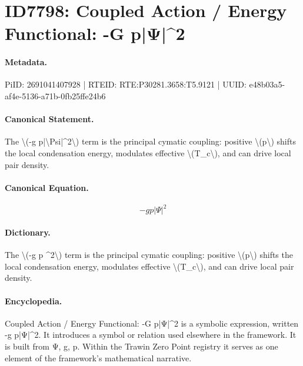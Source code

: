 \section*{ID7798: Coupled Action / Energy Functional: -G p|Ψ|\textasciicircum{}2}
\paragraph{Metadata.}
PiID: 2691041407928 | RTEID: RTE:P30281.3658:T5.9121 | UUID: e48b03a5-af4e-5136-a71b-0fb25ffe24b6

\paragraph{Canonical Statement.}
The \textbackslash{}(-g p|\textbackslash{}Psi|\textasciicircum{}2\textbackslash{}) term is the principal cymatic coupling: positive \textbackslash{}(p\textbackslash{}) shifts the local condensation energy, modulates effective \textbackslash{}(T\_c\textbackslash{}), and can drive local pair density.

\paragraph{Canonical Equation.}
\[
-g p|\Psi|^2
\]

\paragraph{Dictionary.}
The \textbackslash{}(-g p \textasciicircum{}2\textbackslash{}) term is the principal cymatic coupling: positive \textbackslash{}(p\textbackslash{}) shifts the local condensation energy, modulates effective \textbackslash{}(T\_c\textbackslash{}), and can drive local pair density.

\paragraph{Encyclopedia.}
Coupled Action / Energy Functional: -G p|Ψ|\textasciicircum{}2 is a symbolic expression, written -g p|Ψ|\textasciicircum{}2. It introduces a symbol or relation used elsewhere in the framework. It is built from Ψ, g, p. Within the Trawin Zero Point registry it serves as one element of the framework's mathematical narrative.
